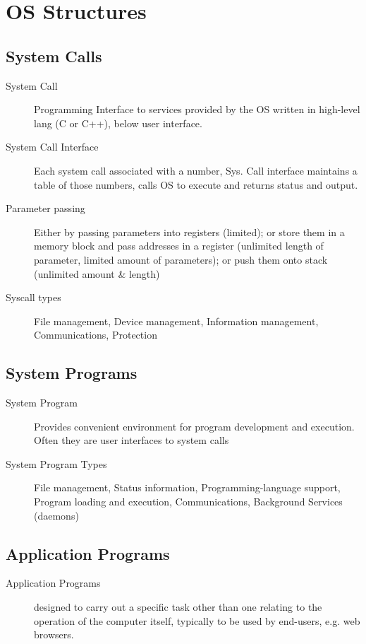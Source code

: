 \section*{OS Structures}

\subsection*{System Calls}
\begin{description}
    \item[System Call] Programming Interface to services provided by the OS written in high-level lang (C or C++), below user interface.
   \item[System Call Interface] Each system call associated with a number, Sys. Call interface maintains a table of those numbers, calls OS to execute and returns status and output.
   \item[Parameter passing] Either by passing parameters into registers (limited); or store them in a memory block and pass addresses in a register (unlimited length of parameter, limited amount of parameters); or push them onto stack (unlimited amount \& length)
  \item[Syscall types] File management, Device management, Information management, Communications, Protection

\end{description}

\subsection*{System Programs}
\begin{description}
  \item[System Program]Provides convenient environment for program development and execution. Often they are user interfaces to system calls
  \item[System Program Types] File management, Status information, Programming-language support, Program loading and execution, Communications, Background Services (daemons)
\end{description}

\subsection*{Application Programs}
\begin{description}
  \item[Application Programs]  designed to carry out a specific task other than one relating to the operation of the computer itself, typically to be used by end-users, e.g. web browsers.
\end{description}

